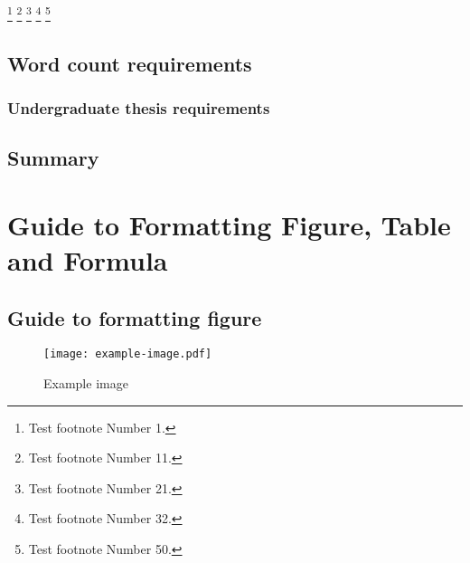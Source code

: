 \footnote[1]{Test footnote Number 1.}
\footnote[11]{Test footnote Number 11.}
\footnote[21]{Test footnote Number 21.}
\footnote[32]{Test footnote Number 32.}
\footnote[50]{Test footnote Number 50.}

\section{Word count requirements}

\subsection{Undergraduate thesis requirements}

\lipsum[5]

\section{Summary}

\lipsum[6]


\chapter{Guide to Formatting Figure, Table and Formula}

\section{Guide to formatting figure}

\begin{figure}[ht]
  \centering
  \texttt{[image: example-image.pdf]}
  \caption{Example image}
  \label{fig:example}
\end{figure}

